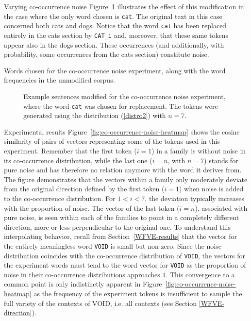 \documentclass{article} %
\newcommand{\word}[1]{\texttt{#1}}
\begin{document}
\begin{section}{Varying co-occurrence noise}
Figure~\ref{fig:co-occurrence-noise-experiment-text} illustrates the
effect of this modification in the case where the only word chosen is
\word{cat}.  The original text in this case concerned both cats and
dogs.  Notice that the word \word{cat} has been replaced entirely in the
cats section by \word{CAT\_i} and, moreover, that these same tokens
appear also in the dogs section. These occurrences (and additionally,
with probability, some occurrences from the cats section) constitute
noise.

\begin{table}
	
	\label{fig:co-occurrence-noise-counts}
	\caption{Words chosen for the co-occurrence noise experiment,
          along with the word frequencies in the unmodified corpus. }
	\label{cooccurrence-noise-words}
\end{table}

\begin{figure}
	\begin{mdframed}
	
	\end{mdframed}
	\caption{Example sentences modified for the co-occurrence noise
          experiment, where the word \word{cat} was chosen for
          replacement.  The tokens were generated using the distribution
          (\ref{distro2}) with $n=7$.}
	\label{fig:co-occurrence-noise-experiment-text}
\end{figure}

\begin{subsection}{Experimental results}
%
Figure~\ref{fig:co-occurrence-noise-heatmap} shows the cosine similarity
of pairs of vectors representing some of the tokens used in this
experiment.  Remember that the first token ($i=1$) in a family is
without noise in its co-occurrence distribution, while the last one
($i=n$, with $n=7$) stands for pure noise and has therefore no relation
anymore with the word it derives from.  The figure demonstrates that the
vectors within a family only moderately deviate from the original
direction defined by the first token ($i=1$) when noise is added to the
co-occurrence distribution.  For $1<i<7$, the deviation typically
increases with the proportion of noise.  The vector of the last token
($i=n$), associated with pure noise, is seen within each of the families
to point in a completely different direction, more or less perpendicular
to the original one.  To understand this interpolating behavior, recall
from Section~\ref{WFVE-results} that the vector for the entirely
meaningless word \word{VOID} is small but non-zero.  Since the noise
distribution coincides with the co-occurrence distribution of
\word{VOID}, the vectors for the experiment words must tend to the word
vector for \word{VOID} as the proportion of noise in their co-occurrence
distributions approaches $1$.
This convergence to a common point is only indistinctly apparent in
Figure~\ref{fig:co-occurrence-noise-heatmap} as the frequency of the experiment
tokens is insufficient to sample the full variety of the contexts of VOID, i.e.
all contexts (see Section \ref{WFVE-direction}).


\end{subsection}
\end{section}
\end{document}
